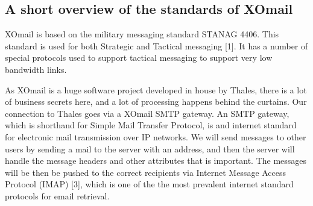 \subsection*{A short overview of the standards of XOmail}
XOmail is based on the military messaging standard STANAG 4406. This standard is used for both Strategic and Tactical messaging [1]. It has a number of special protocols used to support tactical messaging to support very low bandwidth links.

\newpage
As XOmail is a huge software project developed in house by Thales, there is a lot of business secrets here, and a lot of processing happens behind the curtains. Our connection to Thales goes via a XOmail SMTP gateway. An SMTP gateway, which is shorthand for Simple Mail Transfer Protocol, is and internet standard for electronic mail transmission over IP networks. We will send messages to other users by sending a mail to the server with an address, and then the server will handle the message headers and other attributes that is important. The messages will be then be pushed to the correct recipients via Internet Message Access Protocol (IMAP) [3], which is one of the the most prevalent internet standard protocols for email retrieval.

